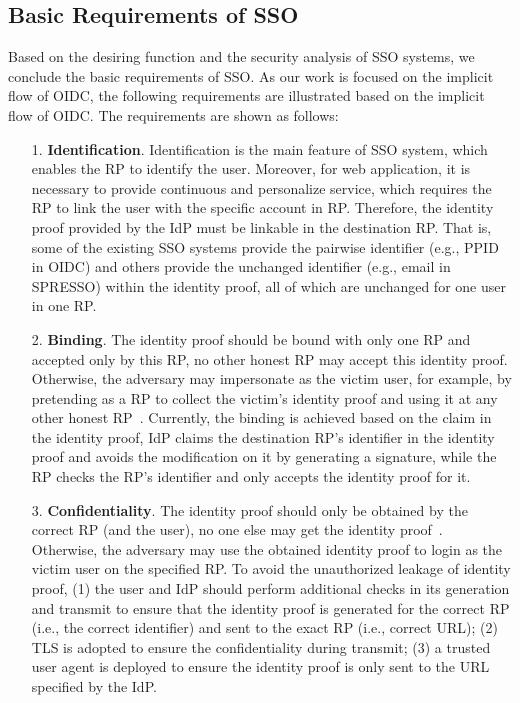 \subsection{Basic Requirements of SSO}
Based on the desiring function and the security analysis of SSO systems, we conclude the basic requirements of SSO. As our work is focused on the implicit flow of OIDC, the following requirements are illustrated based on the implicit flow of OIDC.
The requirements are shown as follows:
\begin{itemize}
\item[1.] \textbf{Identification}. Identification is the main feature of SSO system, which enables the RP to identify the user. Moreover, for web application, it is necessary to provide continuous and personalize service, which requires the RP to link the user with the specific account in RP. Therefore, the identity proof provided by the IdP must be linkable in the destination RP. That is, some of the existing SSO systems provide the pairwise identifier (e.g., PPID in OIDC) and others provide the unchanged identifier (e.g., email in SPRESSO) within the identity proof, all of which are unchanged for one user in one RP.
\item[2.] \textbf{Binding}. The identity proof should be bound with only one RP and accepted only by this RP, no other honest RP may accept this identity proof. Otherwise, the adversary may impersonate as the victim user, for example, by pretending as a RP to collect the victim's identity proof and using it at any other honest RP~\cite{ChenPCTKT14, WangZLG16}. 
        Currently, the binding is achieved based on the claim in the identity proof, IdP claims the destination RP's identifier in the identity proof and avoids the modification on it by generating a signature, while the RP checks the RP's identifier and only accepts the identity proof for it. 
\item[3.] \textbf{Confidentiality}. The identity proof should only be obtained by the correct RP (and the user), no one else may get the identity proof~\cite{ChenPCTKT14,FettKS16,WangZLG16}. Otherwise, the adversary may use the obtained identity proof to login as the victim user on the specified RP. To avoid the unauthorized leakage of identity proof, (1) the  user and IdP should perform additional checks  in its generation and transmit to ensure that the identity proof is generated for the correct RP (i.e., the correct identifier) and sent to the exact RP (i.e., correct URL); (2) TLS is adopted to ensure the confidentiality during transmit; (3) a trusted user agent is deployed to ensure the identity proof is only sent to the URL specified by the IdP.

\end{itemize}
